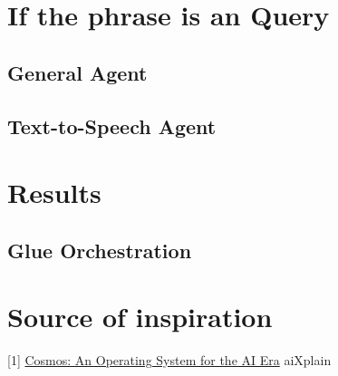 \documentclass{article}
\begin{document}
\section*{If the phrase is an Query}

\subsection*{\color{draculayellow}General Agent}

\subsection*{\color{draculayellow}Text-to-Speech Agent}

\section*{\color{draculagreen}Results}

\subsection*{\color{draculagreen}Glue Orchestration}

\section*{\color{draculagreen}Source of inspiration}

[1] \href{https://humane.com/media/cosmos-an-operating-system-for-the-ai-era}{Cosmos: An Operating System for the AI Era} \newline
[2] aiXplain
\end{document}
